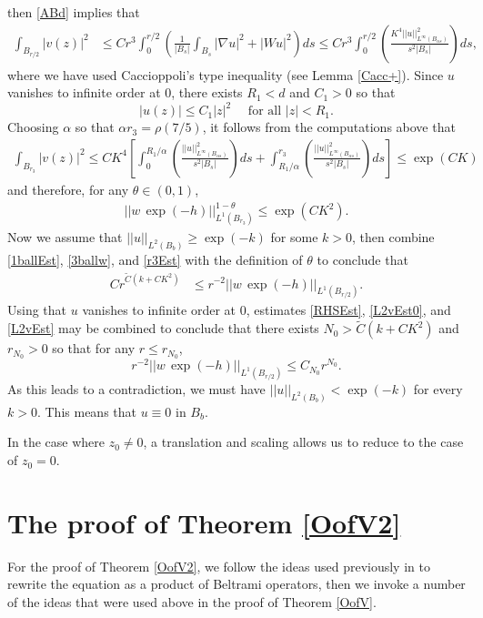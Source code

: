 \documentclass[12pt,reqno]{amsart}
\theoremstyle{plain}
\theoremstyle{definition}
\newcommand{\al}{\alpha}
\newcommand{\te}{\theta}
\newcommand{\iny}{\infty}
\newcommand{\gr}{\nabla}
\newcommand{\norm}[1]{\left\vert \left\vert #1\right\vert\right\vert}
\newcommand{\abs}[1]{\left\vert#1\right\vert}
\newcommand{\brac}[1]{\left[#1\right]}
\newcommand{\pr}[1]{\left( #1 \right) }
\begin{document}
then \eqref{ABd} implies that
\begin{align}
\int_{B_{r/2}} \abs{v\pr{z}}^2
&\le Cr^3 \int_0^{r/2} \pr{\frac{1}{|B_s|}\int_{B_s}|\gr u |^2 + \abs{W u}^2  } ds 
\le Cr^3 \int_0^{r/2} \pr{\frac{K^4 \norm{u}_{L^\iny\pr{B_{\al s}}}^2}{s^2|B_s|}   } ds,
\label{L2vEst}
\end{align}
where we have used Caccioppoli's type inequality (see Lemma \ref{Cacc+}).
Since $u$ vanishes to infinite order at $0$, there exists $R_1 < d$ and $C_1 > 0$ so that
$$\abs{u\pr{z}} \le C_1 \abs{z}^2 \quad \text{ for all } \abs{z} < R_1.$$
Choosing $\al$ so that $\al r_3 = \rho\pr{7/5}$, it follows from the computations above that
\begin{align*}
\int_{B_{r_3}} \abs{v\pr{z}}^2
\le CK^4 \brac{\int_0^{R_1/\al} \pr{\frac{ \norm{u}_{L^\iny\pr{B_{\al s}}}^2}{s^2|B_s|}   } ds + \int_{R_1/\al}^{r_3} \pr{\frac{\norm{u}_{L^\iny\pr{B_{\al s}}}^2}{s^2|B_s|}   } ds}
\le \exp\pr{C K}
\end{align*}
and therefore, for any $\te \in \pr{0,1}$,
\begin{align}
\norm{w \, \exp\pr{-h}}_{L^1\pr{B_{r_3}}}^{1 - \te} \le \exp\pr{C K^2}.
\label{r3Est}
\end{align}
Now we assume that $\norm{u}_{L^2\pr{B_b}} \ge \exp\pr{-k}$ for some $k > 0$, then combine \eqref{1ballEst}, \eqref{3ballw}, and \eqref{r3Est} with the definition of $\te$ to conclude that
\begin{align*}
C r^{\tilde C \pr{k + C K^2}}
&\le  r^{-2} \norm{w \, \exp\pr{-h}}_{L^1\pr{B_{r/2}}}.
\end{align*}
Using that $u$ vanishes to infinite order at $0$, estimates \eqref{RHSEst}, \eqref{L2vEst0}, and \eqref{L2vEst} may be combined to conclude that there exists $N_0 > \tilde C \pr{k + C K^2}$ and $r_{N_0} > 0$ so that for any $r \le r_{N_0}$,
$$r^{-2} \norm{w \, \exp\pr{-h}}_{L^1\pr{B_{r/2}}} \le C_{N_0} r^{N_0}.$$
As this leads to a contradiction, we must have $\norm{u}_{L^2\pr{B_b}} < \exp\pr{-k}$ for every $k > 0$.
This means that $u \equiv 0$ in $B_b$.

In the case where $z_0 \ne 0$, a translation and scaling allows us to reduce to the case of $z_0 = 0$.

\section{The proof of Theorem \ref{OofV2}}
\label{S7}

For the proof of Theorem \ref{OofV2}, we follow the ideas used previously in \cite{DKW17} to rewrite the equation as a product of Beltrami operators, then we invoke a number of the ideas that were used above in the proof of Theorem \ref{OofV}.
\end{document}
